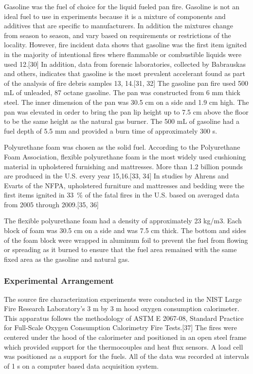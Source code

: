 \documentclass[twoside]{uocthesis}
\begin{document}
Gasoline was the fuel of choice for the liquid fueled pan fire.  Gasoline is not an ideal fuel to use in experiments because it is a mixture of components and additives that are specific to manufacturers. In addition the mixtures change from season to season, and vary based on requirements or restrictions of the locality.  However, fire incident data shows that gasoline was the first item ignited in the majority of intentional fires where flammable or combustible liquids were used 12.[30] In addition, data from forensic laboratories, collected by Babrauskas and others, indicates that gasoline is the most prevalent accelerant found as part of the analysis of fire debris samples 13, 14.[31, 32] 
The gasoline pan fire used 500 mL of unleaded, 87 octane gasoline.  The pan was constructed from 6 mm thick steel.  The inner dimension of the pan was 30.5 cm on a side and 1.9 cm high.  The pan was elevated in order to bring the pan lip height up to 7.5 cm above the floor to be the same height as the natural gas burner.  The 500 mL of gasoline had a fuel depth of 5.5 mm and provided a burn time of approximately 300 s.
   
Polyurethane foam was chosen as the solid fuel.  According to the Polyurethane Foam Association, flexible polyurethane foam is the most widely used cushioning material in upholstered furnishing and mattresses. More than 1.2 billion pounds are produced in the U.S. every year 15,16.[33, 34] In studies by Ahrens and Evarts of the NFPA, upholstered furniture and mattresses and bedding were the first items ignited in 33~\% of the fatal fires in the U.S. based on averaged data from 2005 through 2009.[35, 36]  
 
The flexible polyurethane foam had a density of approximately 23 kg/m3.  Each block of foam was 30.5 cm on a side and was 7.5 cm thick. The bottom and sides of the foam block were wrapped in aluminum foil to prevent the fuel from flowing or spreading as it burned to ensure that the fuel area remained with the same fixed area as the gasoline and natural gas. 
  
\subsubsection{Experimental Arrangement}

The source fire characterization experiments were conducted in the NIST Large Fire Research Laboratory’s 3 m by 3 m hood oxygen consumption calorimeter. This apparatus follows the methodology of ASTM E 2067-08, Standard Practice for Full-Scale Oxygen Consumption Calorimetry Fire Tests.[37]  The fires were centered under the hood of the calorimeter and positioned in an open steel frame which provided support for the thermocouples and heat flux sensors. A load cell was positioned as a support for the fuels.  All of the data was recorded at intervals of 1 s on a computer based data acquisition system. 
 
\end{document}
